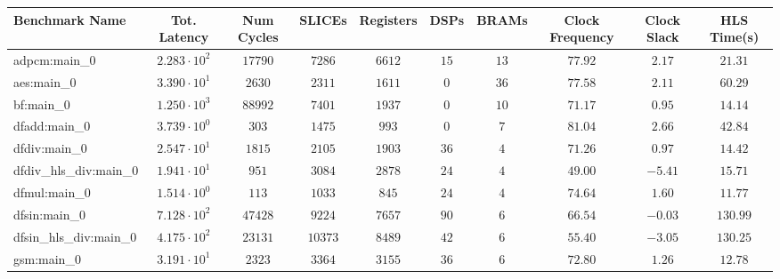 \begin{tabular}{|l|c|c|c|c|c|c|c|c|c|}
\hline
Benchmark Name          & Tot. Latency           & Num Cycles & SLICEs    & Registers & DSPs    & BRAMs   & Clock Frequency & Clock Slack & HLS Time(s) \\
\hline
adpcm:main\_0           & $ 2.283 \cdot 10^{2} $ & $ 17790  $ & $ 7286  $ & $ 6612  $ & $ 15  $ & $ 13  $ & $ 77.92       $ & $ 2.17    $ & $ 21.31   $ \\
aes:main\_0             & $ 3.390 \cdot 10^{1} $ & $ 2630   $ & $ 2311  $ & $ 1611  $ & $ 0   $ & $ 36  $ & $ 77.58       $ & $ 2.11    $ & $ 60.29   $ \\
bf:main\_0              & $ 1.250 \cdot 10^{3} $ & $ 88992  $ & $ 7401  $ & $ 1937  $ & $ 0   $ & $ 10  $ & $ 71.17       $ & $ 0.95    $ & $ 14.14   $ \\
dfadd:main\_0           & $ 3.739 \cdot 10^{0} $ & $ 303    $ & $ 1475  $ & $ 993   $ & $ 0   $ & $ 7   $ & $ 81.04       $ & $ 2.66    $ & $ 42.84   $ \\
dfdiv:main\_0           & $ 2.547 \cdot 10^{1} $ & $ 1815   $ & $ 2105  $ & $ 1903  $ & $ 36  $ & $ 4   $ & $ 71.26       $ & $ 0.97    $ & $ 14.42   $ \\
dfdiv\_hls\_div:main\_0 & $ 1.941 \cdot 10^{1} $ & $ 951    $ & $ 3084  $ & $ 2878  $ & $ 24  $ & $ 4   $ & $ 49.00       $ & $ -5.41   $ & $ 15.71   $ \\
dfmul:main\_0           & $ 1.514 \cdot 10^{0} $ & $ 113    $ & $ 1033  $ & $ 845   $ & $ 24  $ & $ 4   $ & $ 74.64       $ & $ 1.60    $ & $ 11.77   $ \\
dfsin:main\_0           & $ 7.128 \cdot 10^{2} $ & $ 47428  $ & $ 9224  $ & $ 7657  $ & $ 90  $ & $ 6   $ & $ 66.54       $ & $ -0.03   $ & $ 130.99  $ \\
dfsin\_hls\_div:main\_0 & $ 4.175 \cdot 10^{2} $ & $ 23131  $ & $ 10373 $ & $ 8489  $ & $ 42  $ & $ 6   $ & $ 55.40       $ & $ -3.05   $ & $ 130.25  $ \\
gsm:main\_0             & $ 3.191 \cdot 10^{1} $ & $ 2323   $ & $ 3364  $ & $ 3155  $ & $ 36  $ & $ 6   $ & $ 72.80       $ & $ 1.26    $ & $ 12.78   $ \\

\end{tabular}
